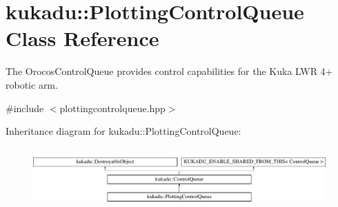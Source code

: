 \hypertarget{classkukadu_1_1PlottingControlQueue}{\section{kukadu\-:\-:Plotting\-Control\-Queue Class Reference}
\label{classkukadu_1_1PlottingControlQueue}
}


The Orocos\-Control\-Queue provides control capabilities for the Kuka L\-W\-R 4+ robotic arm.  




{\ttfamily \#include $<$plottingcontrolqueue.\-hpp$>$}

Inheritance diagram for kukadu\-:\-:Plotting\-Control\-Queue\-:\begin{figure}[H]
\begin{center}
\leavevmode
\includegraphics[height=2.301370cm]{classkukadu_1_1PlottingControlQueue}
\end{center}
\end{figure}

